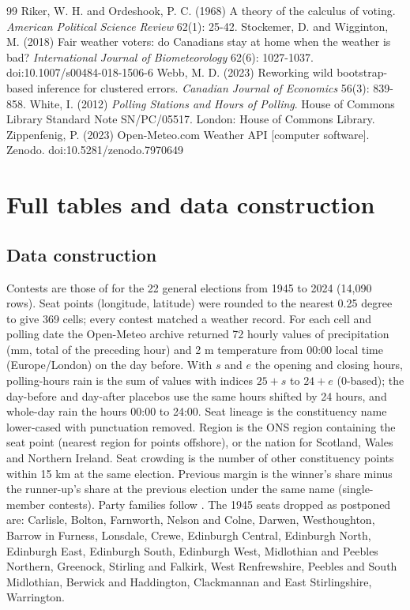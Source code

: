 \documentclass[11pt,a4paper]{article}
\begin{document}
\begin{thebibliography}{99}
 Riker, W. H. and Ordeshook, P. C. (1968) A theory of the calculus of voting. \textit{American Political Science Review} 62(1): 25-42.
 Stockemer, D. and Wigginton, M. (2018) Fair weather voters: do Canadians stay at home when the weather is bad? \textit{International Journal of Biometeorology} 62(6): 1027-1037. doi:10.1007/s00484-018-1506-6
 Webb, M. D. (2023) Reworking wild bootstrap-based inference for clustered errors. \textit{Canadian Journal of Economics} 56(3): 839-858.
 White, I. (2012) \textit{Polling Stations and Hours of Polling}. House of Commons Library Standard Note SN/PC/05517. London: House of Commons Library.
 Zippenfenig, P. (2023) Open-Meteo.com Weather API [computer software]. Zenodo. doi:10.5281/zenodo.7970649
\end{thebibliography}

\appendix
\section{Full tables and data construction}
\subsection{Data construction}
Contests are those of \citet{hotham2026ele} for the 22 general elections from 1945 to 2024 (14,090 rows). Seat points (longitude, latitude) were rounded to the nearest 0.25 degree to give 369 cells; every contest matched a weather record. For each cell and polling date the Open-Meteo archive returned 72 hourly values of precipitation (mm, total of the preceding hour) and 2 m temperature from 00:00 local time (Europe/London) on the day before. With $s$ and $e$ the opening and closing hours, polling-hours rain is the sum of values with indices $25+s$ to $24+e$ (0-based); the day-before and day-after placebos use the same hours shifted by 24 hours, and whole-day rain the hours 00:00 to 24:00. Seat lineage is the constituency name lower-cased with punctuation removed. Region is the ONS region containing the seat point (nearest region for points offshore), or the nation for Scotland, Wales and Northern Ireland. Seat crowding is the number of other constituency points within 15 km at the same election. Previous margin is the winner's share minus the runner-up's share at the previous election under the same name (single-member contests). Party families follow \citet{hotham2026ele}. The 1945 seats dropped as postponed are: Carlisle, Bolton, Farnworth, Nelson and Colne, Darwen, Westhoughton, Barrow in Furness, Lonsdale, Crewe, Edinburgh Central, Edinburgh North, Edinburgh East, Edinburgh South, Edinburgh West, Midlothian and Peebles Northern, Greenock, Stirling and Falkirk, West Renfrewshire, Peebles and South Midlothian, Berwick and Haddington, Clackmannan and East Stirlingshire, Warrington.
\end{document}

